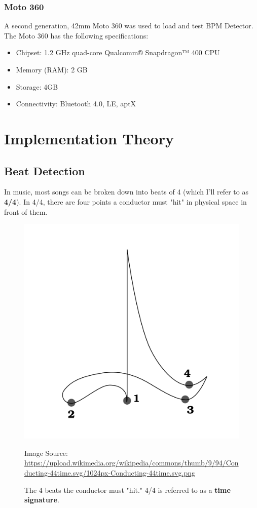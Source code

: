 \documentclass[12pt]{article}
\begin{document}
\subsubsection{Moto 360}
A second generation, 42mm Moto 360 was used to load and test BPM Detector. The Moto 360 has the following specifications:
\begin{itemize}
	\item Chipset: 1.2 GHz quad-core Qualcomm® Snapdragon™ 400 CPU
    \item Memory (RAM): 2 GB
    \item Storage: 4GB
    \item Connectivity: Bluetooth 4.0, LE, aptX
 \end{itemize}

\newpage

\section{Implementation Theory}
\subsection{Beat Detection}
In music, most songs can be broken down into beats of 4 (which I'll refer to as \textbf{4/4}). In 4/4, there are four points a conductor must "hit" in physical space in front of them.

\begin{figure}[h!]
\begin{center}
\includegraphics[width=.5\textwidth]{4-4.png}
\caption{The 4 beats the conductor must "hit." 4/4 is referred to as a \textbf{time signature}.}
\tiny{Image Source: \href{https://upload.wikimedia.org/wikipedia/commons/thumb/9/94/Conducting-44time.svg/1024px-Conducting-44time.svg.png}{https://upload.wikimedia.org/wikipedia/commons/thumb/9/94/Conducting-44time.svg/1024px-Conducting-44time.svg.png}}
\label{fig:4-4}
\end{center}
\end{figure}
\end{document}
